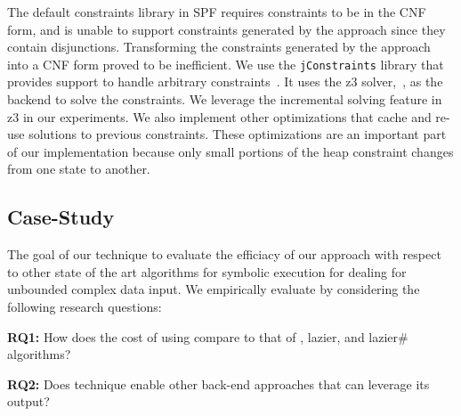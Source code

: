 The default constraints library in SPF requires constraints to be in
the CNF form, and is unable to support constraints generated by the
\symtxt{} approach since they contain disjunctions. Transforming the
constraints generated by the \symtxt{} approach into a CNF form proved
to be inefficient. We use the \texttt{jConstraints} library that
provides support to handle arbitrary
constraints~\cite{ase2014-ghilrr,jpf2014-dghirr}. It uses the z3
solver,~\cite{z3}, as the backend to solve the constraints. We
leverage the incremental solving feature in z3 in our experiments. We
also implement other optimizations that cache and re-use solutions to
previous constraints. These optimizations are an important part of our
implementation because only small portions of the heap constraint
changes from one state to another.

\begin{comment}
Loops and recursive methods over symbolic variables are bounded based
on some user-provided limit. These bounds are based on some
control-flow structure of the program and are often insufficient for
analyzing programs with input of complex data types as demonstrated
in~\cite{Kiasan07,Deng:2006}. In this work we use the $k$-bounding
technique that bounds the length of a reference chain from the root of
the heap~\cite{Deng:2006}.\nsr{check this!} Note we use $k$-bounding
because it preserves the functional equivalence of \gsetxt{}, lazier,
lazier\# and \symtxt{} techniques, a fact which can be established by
induction over the length of reference chains from a given initial
state. The $n$-bounding approach restricts the total number of
references created along a certain path. There is no easy way to
compare the number of references generated by \symtxt{} and other
techniques since \symtxt{} can create many references at a single
access point in its heap summary.
\end{comment}


\subsection{Case-Study} 

The goal of our technique to evaluate the efficiacy of our approach
with respect to other state of the art algorithms for symbolic
execution for dealing for unbounded complex data input. We empirically
evaluate \symtxt{} by considering the following research questions:

\begin{description}
\item {\bf RQ1:} How does the cost of using \symtxt{} compare to that
  of \gsetxt{}, lazier, and lazier\# algorithms?

\item {\bf RQ2:} Does \symtxt{} technique enable other back-end
  approaches that can leverage its output?
\end{description}

